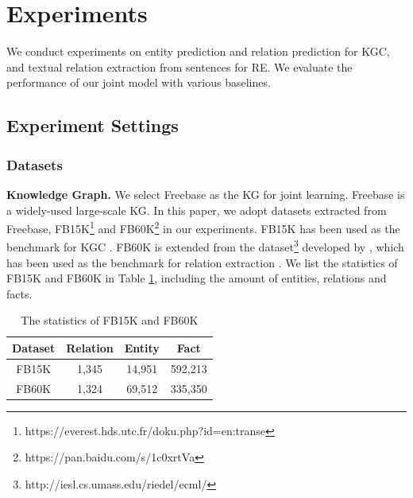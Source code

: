 \documentclass[11pt,a4paper]{article}
\begin{document}
\section{Experiments}

We conduct experiments on entity prediction and relation prediction for KGC, and textual relation extraction from sentences for RE. We evaluate the performance of our joint model with various baselines. 

\subsection{Experiment Settings}

\subsubsection{Datasets}


\textbf{Knowledge Graph.} We select Freebase \cite{bollacker2008freebase} as the KG for joint learning. Freebase is a widely-used large-scale KG. In this paper, we adopt datasets extracted from Freebase, FB15K\footnote{https://everest.hds.utc.fr/doku.php?id=en:transe} and FB60K\footnote{https://pan.baidu.com/s/1c0xrtVa} in our experiments. FB15K has been used as the benchmark for KGC \cite{bordes2013translating,wang2014transh,lin2015learning,ji2015knowledge,he2015learning,xiao2015transg,ji2016knowledge}. FB60K is extended from the dataset\footnote{http://iesl.cs.umass.edu/riedel/ecml/} developed by \cite{riedel2010modeling}, which has been used as the benchmark for relation extraction \cite{riedel2010modeling,hoffmann2011knowledge,surdeanu2012multi,zeng2014relation,zeng2015distant,lin2016neural}. We list the statistics of FB15K and FB60K in Table \ref{tab:statistics-of-FB15K}, including the amount of entities, relations and facts.

\begin{table}[htb]
\centering
\small
\begin{tabular}{|c|c|c|c|}
\hline
Dataset & \textbf{Relation} & \textbf{Entity} & \textbf{Fact} \\ \hline
FB15K   & 1,345           & 14,951            & 592,213 \\ \hline
FB60K   & 1,324           & 69,512            & 335,350 \\ \hline
\end{tabular}
\caption{The statistics of FB15K and FB60K}
\label{tab:statistics-of-FB15K}
\end{table}
\end{document}
